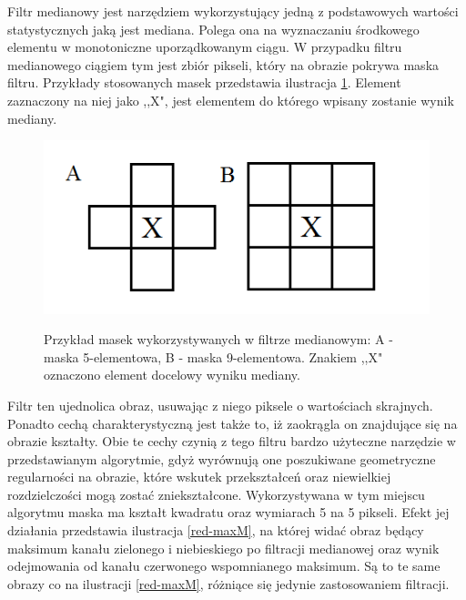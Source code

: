 Filtr medianowy jest narzędziem wykorzystujący jedną z podstawowych wartości statystycznych jaką jest mediana. Polega ona na wyznaczaniu środkowego elementu w monotoniczne uporządkowanym ciągu\cite{Malina}. W przypadku filtru medianowego ciągiem tym jest zbiór pikseli, który na obrazie pokrywa maska filtru. Przykłady stosowanych masek przedstawia ilustracja \ref{maski}. Element zaznaczony na niej jako ,,X", jest elementem do którego wpisany zostanie wynik mediany.\newpage
\begin{figure}[H]
\begin{center}
\includegraphics[scale=0.8]{imgs/maski.png}
\caption[Przykład masek filtru medianowego.]\small{Przykład masek wykorzystywanych w filtrze medianowym: A - maska 5-elementowa, B - maska 9-elementowa. Znakiem ,,X" oznaczono element docelowy wyniku mediany.}
\label{maski}
\end{center}
\end{figure}
Filtr ten ujednolica obraz, usuwając z niego piksele o wartościach skrajnych. Ponadto cechą charakterystyczną jest także to, iż zaokrągla on znajdujące się na obrazie kształty. Obie te cechy czynią z tego filtru bardzo użyteczne narzędzie w przedstawianym algorytmie, gdyż wyrównują one poszukiwane geometryczne regularności na obrazie, które wskutek przekształceń oraz niewielkiej rozdzielczości mogą zostać zniekształcone. Wykorzystywana w tym miejscu algorytmu maska ma kształt kwadratu oraz wymiarach 5 na 5 pikseli. Efekt jej działania przedstawia ilustracja \ref{red-maxM}, na której widać obraz będący maksimum kanału zielonego i niebieskiego po filtracji medianowej oraz wynik odejmowania od kanału czerwonego wspomnianego maksimum. Są to te same obrazy co na ilustracji \ref{red-maxM}, różniące się jedynie zastosowaniem filtracji.

